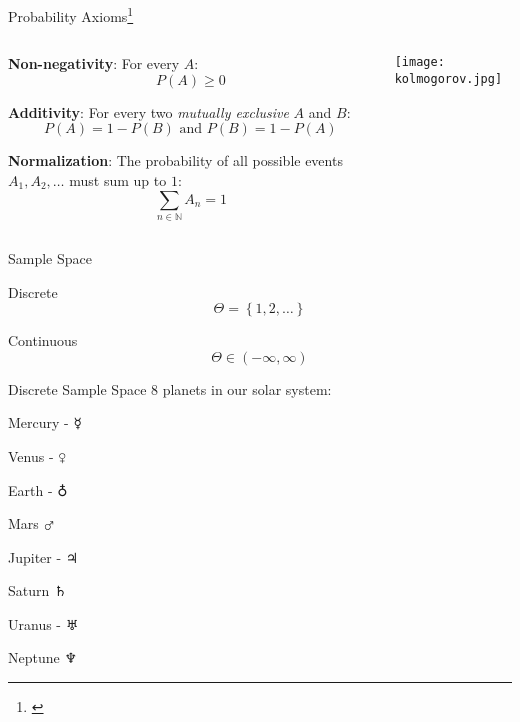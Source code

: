 \begin{frame}{Probability Axioms\footnote{\textcite{kolmogorovFoundationsTheoryProbability1933}}}
	\begin{columns}
		\begin{column}{0.8\textwidth}
			\begin{vfilleditems}
				\item \textbf{Non-negativity}: For every $A$: $$P(A) \geq 0$$ \item \textbf{Additivity}: For every two \textit{mutually exclusive} $A$ and $B$: $$P(A) = 1 - P(B) \text{ and } P(B) = 1 - P(A)$$ \item \textbf{Normalization}: The probability of all possible events $A_1, A_2, \dots$ must sum up to $1$: $$\sum_{n \in \mathbb{N}} A_n = 1$$
			\end{vfilleditems}
		\end{column}
		\begin{column}{0.2\textwidth} \centering \texttt{[image: kolmogorov.jpg]}
		\end{column}
	\end{columns}
\end{frame}

\begin{frame}{Sample Space}
	\begin{vfilleditems}
		\item Discrete $$\Theta = \left\{1, 2, \ldots \right\}$$ \item Continuous $$\Theta \in \left(-\infty, \infty \right)$$
	\end{vfilleditems}
\end{frame}

\begin{frame}{Discrete Sample Space} 8 planets in our solar system:
	\begin{vfilleditems}
		\item Mercury - $\mercury$ \item Venus - $\venus$ \item Earth - $\earth$ \item Mars $\mars$ \item Jupiter - $\jupiter$ \item Saturn $\saturn$ \item Uranus - $\uranus$ \item Neptune $\neptune$
	\end{vfilleditems}
\end{frame}

